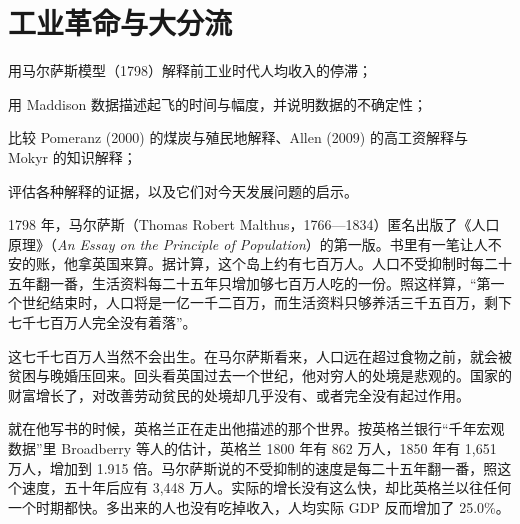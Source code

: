 \chapter{工业革命与大分流}\label{ch:divergence}

\begin{chapterguide}
\begin{guidegoals}
\item 用马尔萨斯模型（1798）解释前工业时代人均收入的停滞；
\item 用 Maddison 数据描述起飞的时间与幅度，并说明数据的不确定性；
\item 比较 Pomeranz (2000) 的煤炭与殖民地解释、Allen (2009) 的高工资解释与 Mokyr 的知识解释；
\item 评估各种解释的证据，以及它们对今天发展问题的启示。
\end{guidegoals}
\end{chapterguide}

1798 年，马尔萨斯（Thomas Robert Malthus，1766—1834）匿名出版了《人口原理》（\emph{An Essay on the Principle of Population}）的第一版\cite{malthus1798}。书里有一笔让人不安的账，他拿英国来算。据计算，这个岛上约有七百万人。人口不受抑制时每二十五年翻一番，生活资料每二十五年只增加够七百万人吃的一份。照这样算，“第一个世纪结束时，人口将是一亿一千二百万，而生活资料只够养活三千五百万，剩下七千七百万人完全没有着落”\cite{malthus1798}。

这七千七百万人当然不会出生。在马尔萨斯看来，人口远在超过食物之前，就会被贫困与晚婚压回来。回头看英国过去一个世纪，他对穷人的处境是悲观的。国家的财富增长了，对改善劳动贫民的处境却几乎没有、或者完全没有起过作用\cite{malthus1798}。

就在他写书的时候，英格兰正在走出他描述的那个世界。按英格兰银行“千年宏观数据”里 Broadberry 等人的估计，英格兰 1800 年有 862 万人，1850 年有 1,651 万人，增加到 1.915 倍\cite{boe2017,broadberry2015}。马尔萨斯说的不受抑制的速度是每二十五年翻一番，照这个速度，五十年后应有 3,448 万人。实际的增长没有这么快，却比英格兰以往任何一个时期都快。多出来的人也没有吃掉收入，人均实际 GDP 反而增加了 25.0\%。

